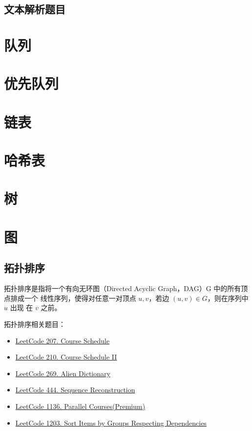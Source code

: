 \subsection{文本解析题目}

\section{队列}

\section{优先队列}

\section{链表}

\section{哈希表}

\section{树}

\section{图}

\subsection{拓扑排序}
拓扑排序是指将一个有向无环图（Directed Acyclic Graph，DAG）G 中的所有顶点排成一个
线性序列，使得对任意一对顶点 $u, v$，若边 $(u, v) \in G$，则在序列中 $u$ 出现
在 $v$ 之前。

拓扑排序相关题目：
\begin{itemize}
  \item
    \href{https://leetcode.com/problems/course-schedule/}{LeetCode 207. Course Schedule}
  \item
    \href{https://leetcode.com/problems/course-schedule-ii/}{LeetCode 210. Course Schedule II}
  \item
    \href{https://leetcode.com/problems/alien-dictionary}{LeetCode 269. Alien Dictionary}
  \item
    \href{https://leetcode.com/problems/sequence-reconstruction}{LeetCode 444.
      Sequence Reconstruction}
  \item
    \href{https://leetcode.com/problems/parallel-courses}{LeetCode 1136. Parallel Courses(Premium)}
  \item
    \href{https://leetcode.com/problems/sort-items-by-groups-respecting-dependencies/}{LeetCode
      1203. Sort Items by Groups Respecting Dependencies}
\end{itemize}

